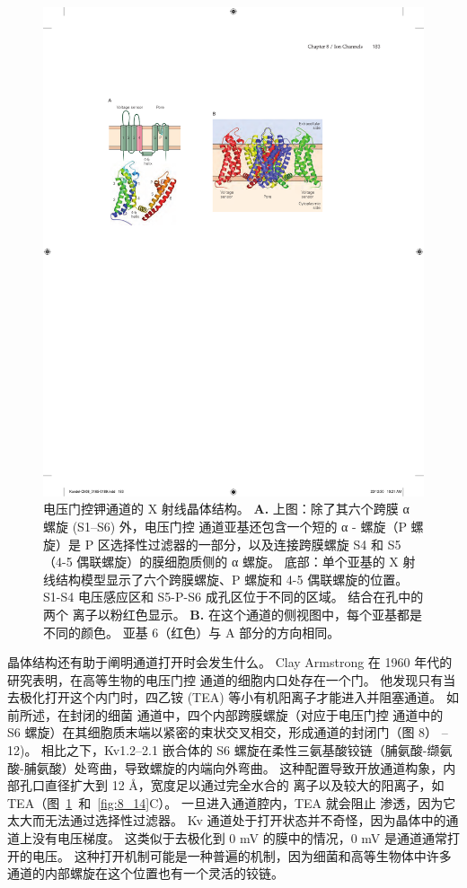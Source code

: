 \begin{figure}[htbp]
	\centering
	\includegraphics[width=0.5\linewidth]{chap08/fig_8_13}
	\caption{电压门控钾通道的 X 射线晶体结构\cite{long2007atomic}。
		\textbf{A.} 上图：除了其六个跨膜 α 螺旋 (S1–S6) 外，电压门控  通道亚基还包含一个短的 α - 螺旋（P 螺旋）是 P 区选择性过滤器的一部分，以及连接跨膜螺旋 S4 和 S5（4-5 偶联螺旋）的膜细胞质侧的 α 螺旋。
		底部：单个亚基的 X 射线结构模型显示了六个跨膜螺旋、P 螺旋和 4-5 偶联螺旋的位置。
		S1-S4 电压感应区和 S5-P-S6 成孔区位于不同的区域。
		结合在孔中的两个  离子以粉红色显示。
		\textbf{B.} 在这个通道的侧视图中，每个亚基都是不同的颜色。
		亚基 6（红色）与 A 部分的方向相同。}
	\label{fig:8_13}
\end{figure}


晶体结构还有助于阐明通道打开时会发生什么。
Clay Armstrong 在 1960 年代的研究表明，在高等生物的电压门控  通道的细胞内口处存在一个门。
他发现只有当去极化打开这个内门时，四乙铵 (TEA) 等小有机阳离子才能进入并阻塞通道。
如前所述，在封闭的细菌  通道中，四个内部跨膜螺旋（对应于电压门控  通道中的 S6 螺旋）在其细胞质末端以紧密的束状交叉相交，形成通道的封闭门（图 8） –12)。
相比之下，Kv1.2–2.1 嵌合体的 S6 螺旋在柔性三氨基酸铰链（脯氨酸-缬氨酸-脯氨酸）处弯曲，导致螺旋的内端向外弯曲。
这种配置导致开放通道构象，内部孔口直径扩大到 12 Å，宽度足以通过完全水合的  离子以及较大的阳离子，如 TEA（图~\ref{fig:8_13}~和~\ref{fig:8_14}C）。
一旦进入通道腔内，TEA 就会阻止  渗透，因为它太大而无法通过选择性过滤器。
Kv 通道处于打开状态并不奇怪，因为晶体中的通道上没有电压梯度。
这类似于去极化到 0 mV 的膜中的情况，0 mV 是通道通常打开的电压。
这种打开机制可能是一种普遍的机制，因为细菌和高等生物体中许多  通道的内部螺旋在这个位置也有一个灵活的铰链。


